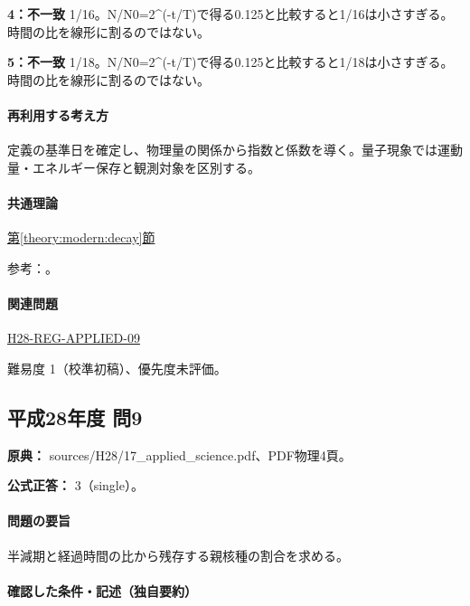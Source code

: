 \noindent\textbf{4：不一致} 1/16。N/N0=\allowbreak{}2\textasciicircum{}(-t/T)で得る0.125と比較すると1/16は小さすぎる。 時間の比を線形に割るのではない。\par

\noindent\textbf{5：不一致} 1/18。N/N0=\allowbreak{}2\textasciicircum{}(-t/T)で得る0.125と比較すると1/18は小さすぎる。 時間の比を線形に割るのではない。\par

\paragraph{再利用する考え方} 定義の基準日を確定し、物理量の関係から指数と係数を導く。量子現象では運動量・エネルギー保存と観測対象を区別する。

\paragraph{共通理論} \hyperref[theory:modern:decay]{第\ref*{theory:modern:decay}節}

\par 参考：\cite{modern_mit_nuclear}。

\paragraph{関連問題} \hyperref[q:h28-reg-applied-09]{H28-REG-APPLIED-09}

\par 難易度 1（校準初稿）、優先度未評価。

\subsection{平成28年度 問9}
\label{q:h28-reg-applied-09}

\noindent\textbf{原典：} sources/H28/17\_applied\_science.pdf、PDF物理4頁。

\textbf{公式正答：} 3（single）。

\paragraph{問題の要旨} 半減期と経過時間の比から残存する親核種の割合を求める。

\paragraph{確認した条件・記述（独自要約）}\mbox{}\par

